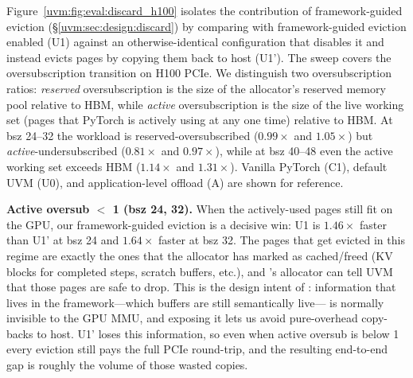 Figure~\ref{uvm:fig:eval:discard_h100} isolates the contribution of framework-guided eviction (\S\ref{uvm:sec:design:discard})
    by comparing {\uvmname} with framework-guided eviction enabled (U1)
    against an otherwise-identical configuration
    that disables it and instead evicts pages by copying them back to host (U1').
The sweep covers the oversubscription transition on H100 PCIe.
We distinguish two oversubscription ratios:
    \emph{reserved} oversubscription is the size of the allocator's reserved memory pool relative to HBM,
    while \emph{active} oversubscription is the size of the live working set
    (pages that PyTorch is actively using at any one time)
    relative to HBM.
At bsz 24--32 the workload is reserved-oversubscribed
    ($0.99\times$ and $1.05\times$)
    but \emph{active}-undersubscribed ($0.81\times$ and $0.97\times$),
    while at bsz 40--48 even the active working set exceeds HBM
    ($1.14\times$ and $1.31\times$).
Vanilla PyTorch (C1), default UVM (U0), and application-level offload (A)
    are shown for reference.

\textbf{Active oversub $<$ 1 (bsz 24, 32).}
When the actively-used pages still fit on the GPU,
    our framework-guided eviction is a decisive win:
    U1 is $1.46\times$ faster than U1' at bsz 24
    and $1.64\times$ faster at bsz 32.
The pages that get evicted in this regime are exactly the ones
    that the allocator has marked as cached/freed
    (KV blocks for completed steps, scratch buffers, etc.),
    and {\uvmname}'s allocator can tell UVM that those pages are safe to drop.
This is the design intent of \uvmname:
    information that lives in the framework---which buffers are still semantically live---%
    is normally invisible to the GPU MMU,
    and exposing it lets us avoid pure-overhead copy-backs to host.
U1' loses this information, so even when active oversub is below 1
    every eviction still pays the full PCIe round-trip,
    and the resulting end-to-end gap is roughly the volume of those wasted copies.


